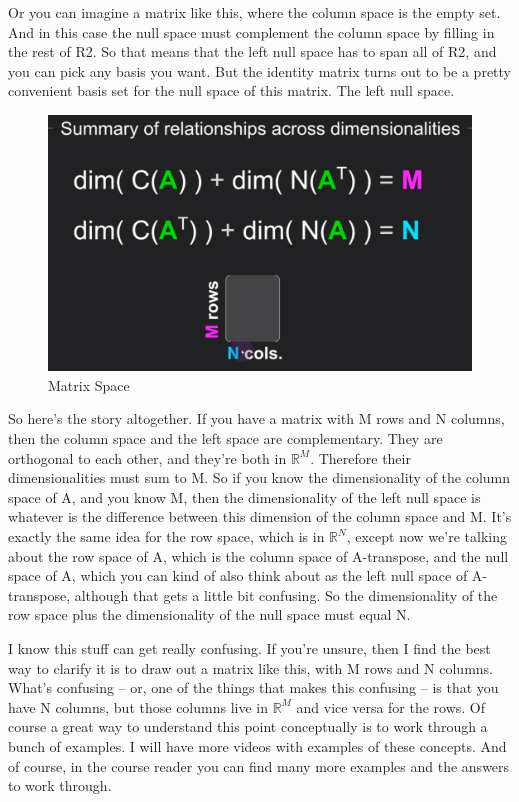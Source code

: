 \documentclass[fleqn,10pt]{olplainarticle}
\theoremstyle{definition}
\theoremstyle{remark}
\begin{document}
Or you can imagine a matrix like this, where the column space is the empty set. And in this case the null space must complement the column space by filling in the rest of R2. So that means that the left null space has to span all of R2, and you can pick any basis you want. But the identity matrix turns out to be a pretty convenient basis set for the null space of this matrix. The left null space.

\begin{figure}[ht]
	\centering
	\includegraphics[width=0.6\linewidth]{images/matrix-space-35.png}
	\caption{Matrix Space}
	\label{fig:matrix_space_35}
\end{figure}

So here's the story altogether. If you have a matrix with M rows and N columns, then the column space and the left space are complementary. They are orthogonal to each other, and they're both in $\mathbb{R}^M$. Therefore their dimensionalities must sum to M. So if you know the dimensionality of the column space of A, and you know M, then the dimensionality of the left null space is whatever is the difference between this dimension of the column space and M. It's exactly the same idea for the row space, which is in $\mathbb{R}^N$, except now we're talking about the row space of A, which is the column space of A-transpose, and the null space of A, which you can kind of also think about as the left null space of A-transpose, although that gets a little bit confusing. So the dimensionality of the row space plus the dimensionality of the null space must equal N. 

I know this stuff can get really confusing. If you're unsure, then I find the best way to clarify it is to draw out a matrix like this, with M rows and N columns. What's confusing -- or, one of the things that makes this confusing -- is that you have N columns, but those columns live in $\mathbb{R}^M$ and vice versa for the rows. Of course a great way to understand this point conceptually is to work through a bunch of examples. I will have more videos with examples of these concepts. And of course, in the course reader you can find many more examples and the answers to work through.
\end{document}
